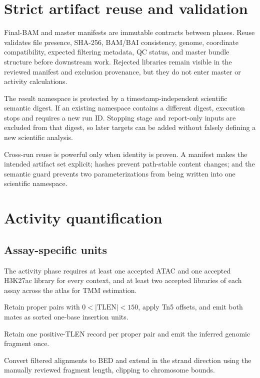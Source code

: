 \documentclass[11pt]{article}
\newcommand{\filep}[1]{\path{#1}}
\begin{document}
\section{Strict artifact reuse and validation}

Final-BAM and master manifests are immutable contracts between phases.  Reuse
validates file presence, SHA-256, BAM/BAI consistency, genome, coordinate
compatibility, expected filtering metadata, QC status, and master bundle
structure before downstream work.  Rejected libraries remain visible in the
reviewed manifest and exclusion provenance, but they do not enter master or
activity calculations.

The result namespace \filep{results/<project>/<run_id>} is protected by a
timestamp-independent scientific semantic digest.  If an existing namespace
contains a different digest, execution stops and requires a new run ID.
Stopping stage and report-only inputs are excluded from that digest, so later
targets can be added without falsely defining a new scientific analysis.

Cross-run reuse is powerful only when identity is proven.  A manifest makes
the intended artifact set explicit; hashes prevent path-stable content changes;
and the semantic guard prevents two parameterizations from being written into
one scientific namespace.

\section{Activity quantification}

\subsection{Assay-specific units}

The activity phase requires at least one accepted ATAC and one accepted
H3K27ac library for every context, and at least two accepted libraries of each
assay across the atlas for TMM estimation.

\begin{description}[style=nextline,leftmargin=2.2em]
  \item[Paired-end ATAC]
  Retain proper pairs with \(0 < |\mathrm{TLEN}| < 150\), apply Tn5 offsets,
  and emit both mates as sorted one-base insertion units.

  \item[Paired-end H3K27ac]
  Retain one positive-TLEN record per proper pair and emit the inferred genomic
  fragment once.

  \item[Single-end H3K27ac]
  Convert filtered alignments to BED and extend in the strand direction using
  the manually reviewed fragment length, clipping to chromosome bounds.
\end{description}
\end{document}
